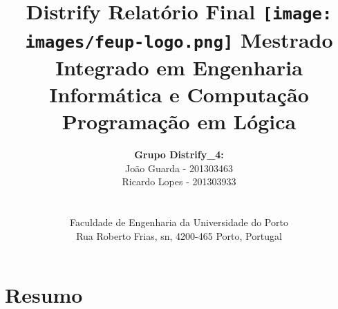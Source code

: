 \documentclass[a4paper]{article}
\begin{document}
\setlength{\parindent}{3em}
\setlength{\parskip}{1em}
\setlength{\textwidth}{16cm}
\setlength{\textheight}{22cm}

\title{\Huge\textbf{Distrify}\linebreak\linebreak\linebreak
\Large\textbf{Relatório Final}\linebreak\linebreak
\linebreak\linebreak
\texttt{[image: images/feup-logo.png]}\linebreak\linebreak
\linebreak\linebreak
\Large{Mestrado Integrado em Engenharia Informática e Computação} \linebreak\linebreak
\Large{Programação em Lógica}\linebreak
}
\author{\textbf{Grupo Distrify\_4:}\\
João Guarda - 201303463 \\
Ricardo Lopes - 201303933 \\
\linebreak\linebreak \\
 \\ Faculdade de Engenharia da Universidade do Porto \\ Rua Roberto Frias, s\/n, 4200-465 Porto, Portugal \linebreak\linebreak\linebreak
\linebreak\linebreak\vspace{1cm}}

\maketitle
\thispagestyle{empty}


\newpage

\section*{Resumo}
\end{document}
